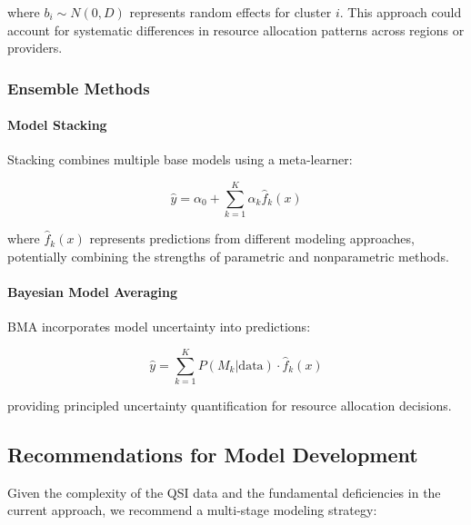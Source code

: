 where $b_i \sim N(0,D)$ represents random effects for cluster $i$. This approach could account for systematic differences in resource allocation patterns across regions or providers.

\subsubsection{Ensemble Methods}

\paragraph{Model Stacking}
Stacking combines multiple base models using a meta-learner:

\begin{equation}
\hat{y} = \alpha_0 + \sum_{k=1}^K \alpha_k \hat{f}_k(x)
\end{equation}

where $\hat{f}_k(x)$ represents predictions from different modeling approaches, potentially combining the strengths of parametric and nonparametric methods.

\paragraph{Bayesian Model Averaging}
BMA incorporates model uncertainty into predictions:

\begin{equation}
\hat{y} = \sum_{k=1}^K P(M_k|\text{data}) \cdot \hat{f}_k(x)
\end{equation}

providing principled uncertainty quantification for resource allocation decisions.

\subsection{Recommendations for Model Development}

Given the complexity of the QSI data and the fundamental deficiencies in the current approach, we recommend a multi-stage modeling strategy:

